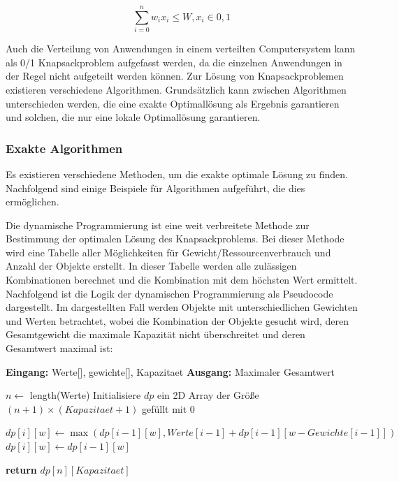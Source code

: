 \begin{equation}
    \sum_{i=0}^n w_i x_i  \leq W, x_i \in {0,1} 
    \label{Eq:Knapsack}
\end{equation}

Auch die Verteilung von Anwendungen in einem verteilten Computersystem kann als 0/1 Knapsackproblem aufgefasst werden, da die einzelnen Anwendungen in der Regel nicht aufgeteilt werden können. Zur Lösung von Knapsackproblemen existieren verschiedene Algorithmen. Grundsätzlich kann zwischen Algorithmen unterschieden werden, die eine exakte Optimallösung als Ergebnis garantieren und solchen, die nur eine lokale Optimallösung garantieren. 

\subsubsection{Exakte Algorithmen}
\label{Exakte Algorithmen}

Es existieren verschiedene Methoden, um die exakte optimale Lösung zu finden. Nachfolgend sind einige Beispiele für Algorithmen aufgeführt, die dies ermöglichen. 

Die dynamische Programmierung ist eine weit verbreitete Methode zur Bestimmung der optimalen Lösung des Knapsackproblems. Bei dieser Methode wird eine Tabelle aller Möglichkeiten für Gewicht/Ressourcenverbrauch und Anzahl der Objekte erstellt. In dieser Tabelle werden alle zulässigen Kombinationen berechnet und die Kombination mit dem höchsten Wert ermittelt. Nachfolgend ist die Logik der dynamischen Programmierung als Pseudocode dargestellt. Im dargestellten Fall werden Objekte mit unterschiedlichen Gewichten und Werten betrachtet, wobei die Kombination der Objekte gesucht wird, deren Gesamtgewicht die maximale Kapazität nicht überschreitet und deren Gesamtwert maximal ist:

\begin{algorithmic}
    \State  \textbf{Eingang:} Werte[], gewichte[], Kapazitaet
    \State  \textbf{Ausgang:} Maximaler Gesamtwert
    
    \State  $n \leftarrow$ length(Werte)
    \State  Initialisiere $dp$ ein 2D Array der Größe $(n+1) \times (Kapazitaet+1)$ gefüllt mit 0
    
                \State $dp[i][w] \leftarrow \max(dp[i-1][w], Werte[i-1] + dp[i-1][w - Gewichte[i-1]])$
            \Else
                \State  $dp[i][w] \leftarrow dp[i-1][w]$
            \EndIf
        \EndFor
    \EndFor
    
    \State  \textbf{return} $dp[n][Kapazitaet]$
\end{algorithmic}

